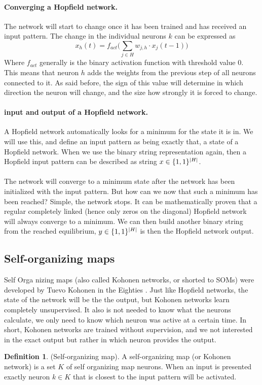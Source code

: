 \documentclass[pdftex,a4paper,12pt,twoside]{report}
\theoremstyle{plain} \newtheorem{theorem}{Theorem} \newtheorem{proposition}{Proposition} \newtheorem{lemma}{Lemma} \newtheorem*{corollary}{Corollary}
\theoremstyle{definition} \newtheorem{definition}{Definition} \newtheorem{conjecture}{Conjecture} \newtheorem*{example}{Example} \newtheorem{algorithm}{Algorithm}
\theoremstyle{remark} \newtheorem*{remark}{Remark} \newtheorem*{note}{Note} \newtheorem{case}{Case}
\begin{document}
\paragraph{Converging a Hopfield network.}
The network will start to change once it has been trained and has received an input pattern. The change in the individual neurons $k$ can be expressed as
\begin{equation}
x_h(t) = f_{act} \bigg(\sum_{j \in H} w_{j,h} \cdot x_j(t-1)\bigg)
\end{equation} Where $f_{act}$ generally is the binary activation function with threshold value 0.\\This means that neuron $h$ adds the weights from the previous step of all neurons connected to it. As said before, the sign of this value will determine in which direction the neuron will change, and the size how strongly it is forced to change. 
\paragraph{input and output of a Hopfield network.} A Hopfield network automatically looks for a minimum for the state it is in. We will use this, and define an input pattern as being exactly that, a state of a Hopfield network. When we use the binary string representation again, then a Hopfield input pattern can be described as string $x \in \{\-1,1\}^{|H|}$.\\\\The network will converge to a minimum state after the network has been initialized with the input pattern. But how can we now that such a minimum has been reached? Simple, the network stops. It can be mathematically proven that a regular completely linked (hence only zeros on the diagonal) Hopfield network will always converge to a minimum. We can then build another binary string from the reached equilibrium, $y \in \{\-1,1\}^{|H|}$ is then the Hopfield network output.
\subsection{Self-organizing maps}
Self Orga nizing maps (also called Kohonen networks, or shorted to SOMs) were developed by Tuevo Kohonen in the Eighties  \citep{kohonen1982}. Just like Hopfield networks, the state of the network will be the the output, but Kohonen networks learn completely unsupervised. It also is not needed to know what the neurons calculate, we only need to know which neuron was active at a certain time. In short, Kohonen networks are trained without supervision, and we not interested in the exact output but rather in which neuron provides the output.
\begin{definition}
(Self-organizing map). A self-organizing map (or Kohonen network) is a set $K$ of self organizing map neurons. When an input is presented exactly neuron $k \in K$ that is closest to the input pattern will be activated.
\end{definition}
\end{document}
